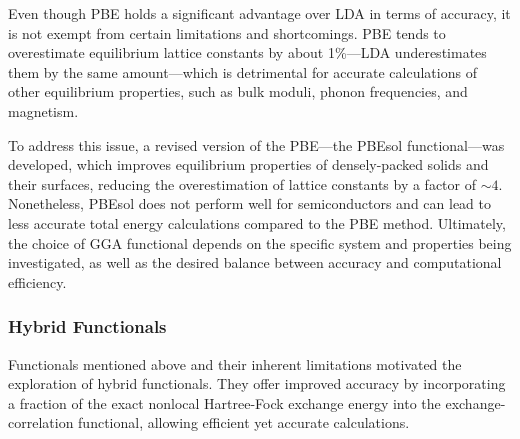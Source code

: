 Even though PBE holds a significant advantage over LDA in terms of accuracy, it is not exempt from certain limitations and shortcomings. PBE tends to overestimate equilibrium lattice constants by about 1\%---LDA underestimates them by the same amount---which is detrimental for accurate calculations of other equilibrium properties, such as bulk moduli, phonon frequencies, and magnetism.

To address this issue, a revised version of the PBE---the PBEsol functional\supercite{Perdew2008}---was developed, which improves equilibrium properties of densely-packed solids and their surfaces, reducing the overestimation of lattice constants by a factor of $\sim 4$. Nonetheless, PBEsol does not perform well for semiconductors and can lead to less accurate total energy calculations compared to the PBE method. Ultimately, the choice of GGA functional depends on the specific system and properties being investigated, as well as the desired balance between accuracy and computational efficiency.

\subsubsection{Hybrid Functionals}
Functionals mentioned above and their inherent limitations motivated the exploration of hybrid functionals. They offer improved accuracy by incorporating a fraction of the exact nonlocal Hartree-Fock exchange energy into the exchange-correlation functional, allowing efficient yet accurate calculations. 

